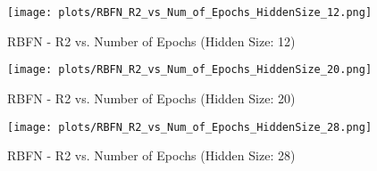 \begin{figure}[H]
    \centering
    \texttt{[image: plots/RBFN\_R2\_vs\_Num\_of\_Epochs\_HiddenSize\_12.png]}
    \caption{RBFN - R2 vs. Number of Epochs (Hidden Size: 12)}
\end{figure}

\begin{figure}[H]
    \centering
    \texttt{[image: plots/RBFN\_R2\_vs\_Num\_of\_Epochs\_HiddenSize\_20.png]}
    \caption{RBFN - R2 vs. Number of Epochs (Hidden Size: 20)}
\end{figure}

\begin{figure}[H]
    \centering
    \texttt{[image: plots/RBFN\_R2\_vs\_Num\_of\_Epochs\_HiddenSize\_28.png]}
    \caption{RBFN - R2 vs. Number of Epochs (Hidden Size: 28)}
\end{figure}
